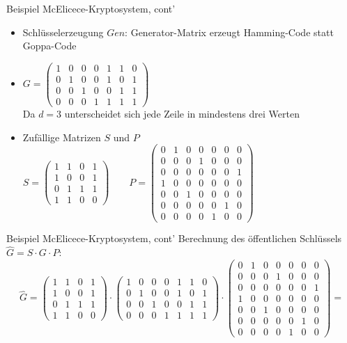 \documentclass[11pt%
,aspectratio=169%
]{beamer}
\begin{document}
\begin{frame}{Beispiel McElicece-Kryptosystem, cont'}
    \begin{itemize}
        \item Schlüsselerzeugung $Gen$: Generator-Matrix erzeugt Hamming-Code statt Goppa-Code
        \item $G=\begin{pmatrix} 1 & 0 & 0 & 0 & 1 & 1 & 0 \\ 0 & 1 & 0 & 0 & 1 & 0 & 1 \\ 0 & 0 & 1 & 0 & 0 & 1 & 1 \\ 0 & 0 & 0 & 1 & 1 & 1 & 1 
        \end{pmatrix}$\\
        Da $d=3$ unterscheidet sich jede Zeile in mindestens drei Werten
        \item Zufällige Matrizen $S$ und $P$
        $S=\begin{pmatrix} 1 & 1 & 0 & 1 \\ 1 & 0 & 0 & 1 \\ 0 & 1 & 1 & 1 \\ 1 & 1 & 0 & 0 \end{pmatrix} \qquad
        P=\begin{pmatrix} 0 & 1 & 0 & 0 & 0 & 0 & 0 \\ 0 & 0 & 0 & 1 & 0 & 0 & 0 \\ 0 & 0 & 0 & 0 & 0 & 0 & 1 \\ 1 & 0 & 0 & 0 & 0 & 0 & 0 \\ 0 & 0 & 1 & 0 & 0 & 0 & 0 \\ 0 & 0 & 0 & 0 & 0 & 1 & 0 \\ 0 & 0 & 0 & 0 & 1 & 0 & 0 \end{pmatrix}$
    \end{itemize}
\end{frame}

\begin{frame}{Beispiel McElicece-Kryptosystem, cont'}
Berechnung des öffentlichen Schlüssels $\hat{G} = S \cdot G \cdot P$:
$$
    \hat{G}=\begin{pmatrix} 1 & 1 & 0 & 1 \\ 1 & 0 & 0 & 1 \\ 0 & 1 & 1 & 1 \\ 1 & 1 & 0 & 0 \end{pmatrix} \cdot \begin{pmatrix} 1 & 0 & 0 & 0 & 1 & 1 & 0 \\ 0 & 1 & 0 & 0 & 1 & 0 & 1 \\ 0 & 0 & 1 & 0 & 0 & 1 & 1 \\ 0 & 0 & 0 & 1 & 1 & 1 & 1 \end{pmatrix} \cdot \begin{pmatrix} 0 & 1 & 0 & 0 & 0 & 0 & 0 \\ 0 & 0 & 0 & 1 & 0 & 0 & 0 \\ 0 & 0 & 0 & 0 & 0 & 0 & 1 \\ 1 & 0 & 0 & 0 & 0 & 0 & 0 \\ 0 & 0 & 1 & 0 & 0 & 0 & 0 \\ 0 & 0 & 0 & 0 & 0 & 1 & 0 \\ 0 & 0 & 0 & 0 & 1 & 0 & 0 \end{pmatrix}=
$$
\end{frame}
\end{document}
